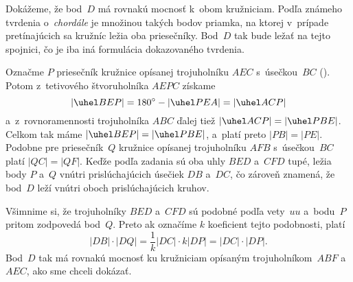 {%
Dokážeme, že bod~$D$ má rovnakú mocnosť k~obom
kružniciam. Podľa známeho tvrdenia o~{\it chordále\/} je množinou takých
bodov priamka, na ktorej v~prípade pretínajúcich sa kružníc ležia oba
priesečníky. Bod~$D$ tak bude ležať na tejto spojnici, čo je iba iná
formulácia dokazovaného tvrdenia.

Označme $P$ priesečník kružnice opísanej trojuholníku $AEC$ s~úsečkou~$BC$ (\obr).
Potom z~tetivového štvoruholníka $AEPC$ získame
$$
|\uhel BEP|=180^\circ - |\uhel PEA| = |\uhel ACP|
$$
a~z~rovnoramennosti trojuholníka $ABC$ ďalej tiež $|\uhel ACP|=|\uhel PBE|$.
Celkom tak máme $|\uhel BEP|=|\uhel PBE|$, a~platí preto $|PB|=|PE|$.
Podobne pre priesečník~$Q$ kružnice opísanej trojuholníku $AFB$ s~úsečkou~$BC$
platí $|QC|=|QF|$. Keďže podľa zadania sú oba uhly $BED$ a~$CFD$ tupé, ležia
body $P$ a~$Q$ vnútri prislúchajúcich úsečiek $DB$ a~$DC$, čo zároveň znamená,
že bod~$D$ leží vnútri oboch prislúchajúcich kruhov.
%

Všimnime si, že trojuholníky $BED$ a~$CFD$ sú podobné podľa vety~$uu$
a~bodu~$P$ pritom zodpovedá bod~$Q$. Preto
ak označíme $k$ koeficient tejto podobnosti, platí
$$
|DB|\cdot|DQ| = \frac{1}{k}|DC| \cdot k|DP| = |DC|\cdot|DP|.
$$
Bod~$D$ tak má rovnakú mocnosť ku kružniciam opísaným trojuholníkom~$ABF$
a~$AEC$, ako sme chceli dokázať.
}

